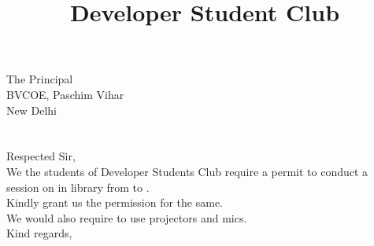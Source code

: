 \documentclass[12pt,a4paper]{article} %
\title{Developer Student Club}
\begin{document}
	
	\date{}
	\maketitle
	\hspace{-8mm}
	The Principal \\
	BVCOE, Paschim Vihar\\
	New Delhi\\
	\linebreak
	\\
	\linebreak
	\textbf{}\\
	\linebreak
	Respected Sir,\\
	
	\vspace{-5mm}
	\hspace{8mm}
	We the students of Developer Students Club require a permit to conduct a session on 
	in library from 
	to 
	.\\
	Kindly grant us the permission for the same. \\
	We would also require to use projectors and mics.\\
	\linebreak
	Kind regards,\\
	\\
	
\end{document}
